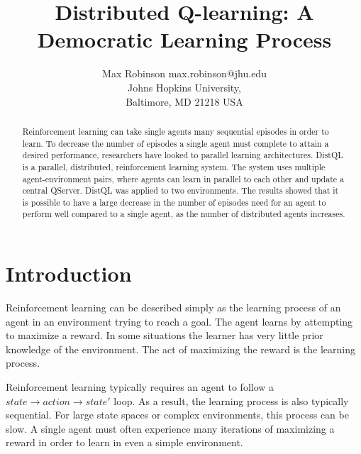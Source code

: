 \documentclass[jair,twoside,11pt,theapa]{article}
\begin{document}
\title{Distributed Q-learning: A Democratic Learning Process}

\author{\name Max Robinson \email max.robinson@jhu.edu \\
       \addr Johns Hopkins University,\\
       Baltimore, MD 21218 USA
   }


\maketitle

\begin{abstract}
Reinforcement learning can take single agents many sequential episodes in order to learn. To decrease the number of episodes a single agent must complete to attain a desired performance, researchers have looked to parallel learning architectures. DistQL is a parallel, distributed, reinforcement learning system. The system uses multiple agent-environment pairs, where agents can learn in parallel to each other and update a central QServer. DistQL was applied to two environments. The results showed that it is possible to have a large decrease in the number of episodes need for an agent to perform well compared to a single agent, as the number of distributed agents increases. 
\end{abstract}

\section{Introduction}
\label{Introduction}
Reinforcement learning can be described simply as the learning process of an agent in an environment trying to reach a goal. 
The agent learns by attempting to maximize a reward. In some situations the learner has very little prior knowledge of the environment. 
The act of maximizing the reward is the learning process.

Reinforcement learning typically requires an agent to follow a $state \to action \to state'$ loop. As a result, the learning process is also typically sequential. 
For large state spaces or complex environments, this process can be slow. A single agent must often experience many iterations of maximizing 
a reward in order to learn in even a simple environment.
\end{document}
